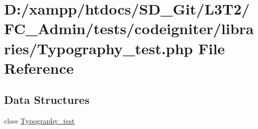 \hypertarget{_typography__test_8php}{}\section{D\+:/xampp/htdocs/\+S\+D\+\_\+\+Git/\+L3\+T2/\+F\+C\+\_\+\+Admin/tests/codeigniter/libraries/\+Typography\+\_\+test.php File Reference}
\label{_typography__test_8php}
\subsection*{Data Structures}
\begin{DoxyCompactItemize}
\item 
class \hyperlink{class_typography__test}{Typography\+\_\+test}
\end{DoxyCompactItemize}
